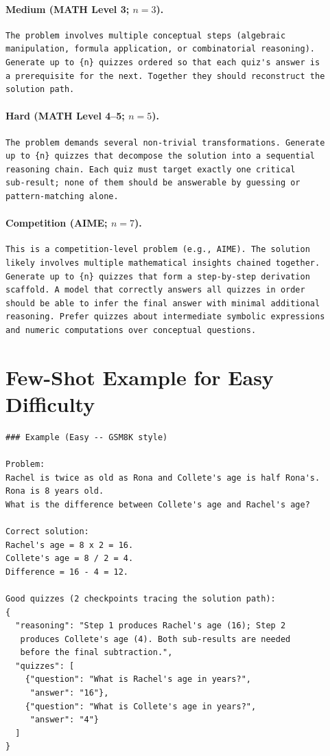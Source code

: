 \documentclass[12pt]{report}
\begin{document}
\paragraph{Medium (MATH Level 3; $n = 3$).}
\noindent\begin{lstlisting}
The problem involves multiple conceptual steps (algebraic
manipulation, formula application, or combinatorial reasoning).
Generate up to {n} quizzes ordered so that each quiz's answer is
a prerequisite for the next. Together they should reconstruct the
solution path.
\end{lstlisting}

\paragraph{Hard (MATH Level 4--5; $n = 5$).}
\noindent\begin{lstlisting}
The problem demands several non-trivial transformations. Generate
up to {n} quizzes that decompose the solution into a sequential
reasoning chain. Each quiz must target exactly one critical
sub-result; none of them should be answerable by guessing or
pattern-matching alone.
\end{lstlisting}

\paragraph{Competition (AIME; $n = 7$).}
\noindent\begin{lstlisting}
This is a competition-level problem (e.g., AIME). The solution
likely involves multiple mathematical insights chained together.
Generate up to {n} quizzes that form a step-by-step derivation
scaffold. A model that correctly answers all quizzes in order
should be able to infer the final answer with minimal additional
reasoning. Prefer quizzes about intermediate symbolic expressions
and numeric computations over conceptual questions.
\end{lstlisting}

\section{Few-Shot Example for Easy Difficulty}
\label{app:fewshot-easy}

\begin{lstlisting}
### Example (Easy -- GSM8K style)

Problem:
Rachel is twice as old as Rona and Collete's age is half Rona's.
Rona is 8 years old.
What is the difference between Collete's age and Rachel's age?

Correct solution:
Rachel's age = 8 x 2 = 16.
Collete's age = 8 / 2 = 4.
Difference = 16 - 4 = 12.

Good quizzes (2 checkpoints tracing the solution path):
{
  "reasoning": "Step 1 produces Rachel's age (16); Step 2
   produces Collete's age (4). Both sub-results are needed
   before the final subtraction.",
  "quizzes": [
    {"question": "What is Rachel's age in years?",
     "answer": "16"},
    {"question": "What is Collete's age in years?",
     "answer": "4"}
  ]
}
\end{lstlisting}
\end{document}
